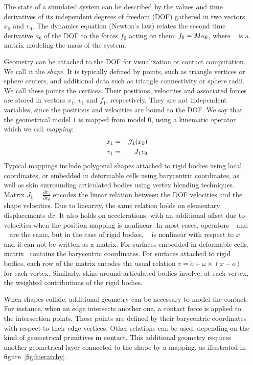 The state of a simulated system can be described by the values and time derivatives of its independent degrees of freedom (DOF) gathered in two vectors $x_0$ and $v_0$.
The dynamics equation (Newton's law) relates the second time derivative $a_0$ of the DOF to the forces $f_0$ acting on them: $f_0 = M a_0$, where \mass~ is a matrix modeling the mass of the system.

Geometry can be attached to the DOF for visualization or contact computation. 
We call it the \textit{shape}.
It is typically defined by points, such as triangle vertices or sphere centers, and additional data such as triangle connectivity or sphere radii.
We call these points the \textit{vertices}. 
Their positions, velocities and associated forces are stored in vectors $x_1$, $v_1$ and $f_1$, respectively.
They are not independent variables, since the positions and velocities are bound to the DOF.
We say that the geometrical model $1$ is mapped from model $0$,
 using a kinematic operator which we call \textit{mapping}:
\begin{eqnarray*} %
x_1 &=&\JNL_1(x_0)\\ 
v_1 &=& J_1 v_0
\end{eqnarray*}
Typical mappings include polygonal shapes attached to rigid bodies using local coordinates, or embedded in deformable cells using barycentric coordinates, as well as skin surrounding articulated bodies using vertex blending techniques.
Matrix $J_1 = \frac{\partial x_1}{\partial x_0}$ encodes the linear relation between the DOF velocities and the shape velocities. Due to linearity, the same relation holds on elementary displacements $dx$.
It also holds on accelerations, with an additional offset due to velocities when the position mapping \JNL is nonlinear.
In most cases, operators \JNL~ and \J~ are the same, but in the case of rigid bodies, \JNL~ is nonlinear with respect to $x$ and it can not be written as a matrix.
For surfaces embedded in deformable cells, matrix \J~contains the barycentric coordinates. 
For surfaces attached to rigid bodies, each row of the matrix encodes the usual relation $v = \dot o + \omega \times (x-o)$ for each vertex. 
Similarly, skins around articulated bodies involve, at each vertex, the weighted  contributions of the rigid bodies. 


When shapes collide, additional geometry can be necessary to model the contact.
For instance, when an edge intersects another one, a contact force is applied to the intersection points.
These points are defined by their barycentric coordinates with respect to their edge vertices. Other relations can be used, depending on the kind of geometrical primitives in contact.
This additional geometry requires another geometrical layer connected to the shape by a mapping, as illustrated in figure~\ref{fig:hierarchy}.

